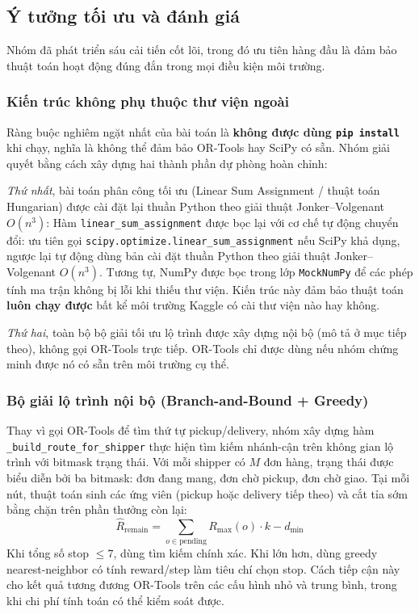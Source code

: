 \documentclass[conference]{IEEEtran}
\begin{document}
\subsection{Ý tưởng tối ưu và đánh giá}
Nhóm đã phát triển sáu cải tiến cốt lõi, trong đó ưu tiên hàng đầu là đảm bảo thuật toán hoạt động đúng đắn trong mọi điều kiện môi trường.
 
\subsubsection{Kiến trúc không phụ thuộc thư viện ngoài}
Ràng buộc nghiêm ngặt nhất của bài toán là \textbf{không được dùng \texttt{pip install}} khi chạy, nghĩa là không thể đảm bảo OR-Tools hay SciPy có sẵn. Nhóm giải quyết bằng cách xây dựng hai thành phần dự phòng hoàn chỉnh:
 
\textit{Thứ nhất}, bài toán phân công tối ưu (Linear Sum Assignment / thuật toán Hungarian) được cài đặt lại thuần Python theo giải thuật Jonker--Volgenant $O(n^3)$:
Hàm \texttt{linear\_sum\_assignment} được bọc lại với cơ chế tự động chuyển đổi: ưu tiên gọi \texttt{scipy.optimize.linear\_sum\_assignment} nếu SciPy khả dụng, ngược lại tự động dùng bản cài đặt thuần Python theo giải thuật Jonker--Volgenant $O(n^3)$.
Tương tự, NumPy được bọc trong lớp \texttt{MockNumPy} để các phép tính ma trận không bị lỗi khi thiếu thư viện. Kiến trúc này đảm bảo thuật toán \textbf{luôn chạy được} bất kể môi trường Kaggle có cài thư viện nào hay không.
 
\textit{Thứ hai}, toàn bộ bộ giải tối ưu lộ trình được xây dựng nội bộ (mô tả ở mục tiếp theo), không gọi OR-Tools trực tiếp. OR-Tools chỉ được dùng nếu nhóm chứng minh được nó có sẵn trên môi trường cụ thể.
 
\subsubsection{Bộ giải lộ trình nội bộ (Branch-and-Bound + Greedy)}
Thay vì gọi OR-Tools để tìm thứ tự pickup/delivery, nhóm xây dựng hàm \texttt{\_build\_route\_for\_shipper} thực hiện tìm kiếm nhánh-cận trên không gian lộ trình với bitmask trạng thái. Với mỗi shipper có $M$ đơn hàng, trạng thái được biểu diễn bởi ba bitmask: đơn đang mang, đơn chờ pickup, đơn chờ giao. Tại mỗi nút, thuật toán sinh các ứng viên (pickup hoặc delivery tiếp theo) và cắt tỉa sớm bằng chặn trên phần thưởng còn lại:
\begin{equation}
\hat{R}_{\text{remain}} = \sum_{o \in \text{pending}} R_{\max}(o) \cdot k - d_{\min}
\end{equation}
Khi tổng số stop $\le 7$, dùng tìm kiếm chính xác. Khi lớn hơn, dùng greedy nearest-neighbor có tính reward/step làm tiêu chí chọn stop. Cách tiếp cận này cho kết quả tương đương OR-Tools trên các cấu hình nhỏ và trung bình, trong khi chi phí tính toán có thể kiểm soát được.
 
\end{document}
